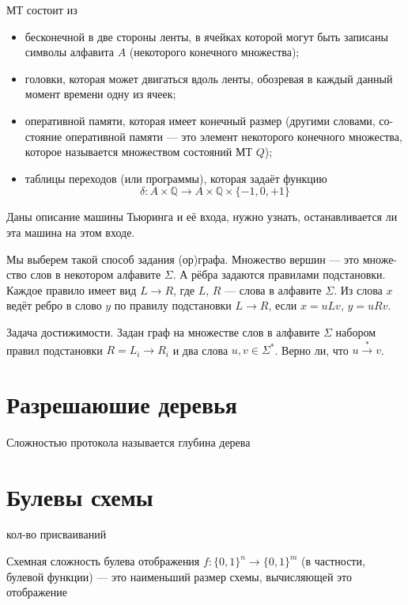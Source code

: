 \documentclass{article}
\newcommand{\Q}{\mathbb{Q}}
\newenvironment{definition}[2][О]{\begin{trivlist}
\item[\hskip \labelsep {\bfseries #1}\hskip \labelsep {\bfseries #2}]}{\end{trivlist}}
\begin{document}
\begin{definition}{МТ}
МТ состоит из
\begin{itemize}
\item бесконечной в две стороны ленты, в ячейках которой могут быть записаны
символы алфавита $A$ (некоторого конечного множества);
\item головки, которая может двигаться вдоль ленты, обозревая в каждый данный
момент времени одну из ячеек;
\item оперативной памяти, которая имеет конечный размер (другими словами, со-
стояние оперативной памяти — это элемент некоторого конечного множества,
которое называется множеством состояний МТ $Q$);
\item таблицы переходов (или программы), которая задаёт функцию
\[
\delta : A \times \Q \to A \times \Q \times \{-1, 0, +1\}
\]
\end{itemize}
\end{definition}

\begin{definition}{Проблема остановки}
Даны описание машины Тьюринга и её входа,
нужно узнать, останавливается ли эта машина на этом входе.
\end{definition}

\begin{definition}{Граф подстановок.}
Мы выберем такой способ задания (ор)графа. Множество вершин — это множе-
ство слов в некотором алфавите $\Sigma$. А рёбра задаются правилами подстановки. Каждое правило имеет вид
$L \to R$,
где $L$, $R$ --- слова в алфавите $\Sigma$. Из слова $x$ ведёт ребро в слово $y$ по правилу подстановки $L \to R$, если $x = uLv$, $y = uRv$.
\end{definition}

\begin{definition}{Проблема остановки.}
Задача достижимости. Задан граф на множестве слов в алфавите $\Sigma$ набором
правил подстановки $R = {L_i \to R_i}$ и два слова $u, v \in \Sigma^{*}$. 
Верно ли, что $u \stackrel{*}{\to} v$.
\end{definition}

\section{Разрешаюшие деревья}
\begin{definition}{Сложность}
Сложностью протокола называется глубина дерева 
\end{definition}

\section{Булевы схемы}
\begin{definition}{Размер}
кол-во присваиваний
\end{definition}
\begin{definition}{Схемная cложность}
Схемная сложность булева отображения $f : {\{0, 1\}}^n \to {\{0, 1\}}^m$
(в частности, булевой функции) --- это наименьший размер схемы, вычисляющей это
отображение
\end{definition}
\end{document}
